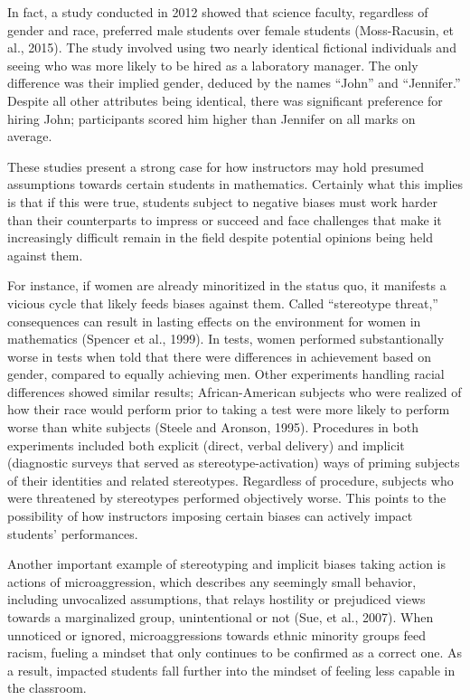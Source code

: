 In fact, a study conducted in 2012 showed that science faculty, regardless of gender and race, preferred male students over female students (Moss-Racusin, et al., 2015). The study involved using two nearly identical fictional individuals and seeing who was more likely to be hired as a laboratory manager. The only difference was their implied gender, deduced by the names ``John'' and ``Jennifer.'' Despite all other attributes being identical, there was significant preference for hiring John; participants scored him higher than Jennifer on all marks on average.

These studies present a strong case for how instructors may hold presumed assumptions towards certain students in mathematics. Certainly what this implies is that if this were true, students subject to negative biases must work harder than their counterparts to impress or succeed and face challenges that make it increasingly difficult remain in the field despite potential opinions being held against them.

For instance, if women are already minoritized in the status quo, it manifests a vicious cycle that likely feeds biases against them. Called ``stereotype threat,'' consequences can result in lasting effects on the environment for women in mathematics (Spencer et al., 1999). In tests, women performed substantionally worse in tests when told that there were differences in achievement based on gender, compared to equally achieving men. Other experiments handling racial differences showed similar results; African-American subjects who were realized of how their race would perform prior to taking a test were more likely to perform worse than white subjects (Steele and Aronson, 1995). Procedures in both experiments included both explicit (direct, verbal delivery) and implicit (diagnostic surveys that served as stereotype-activation) ways of priming subjects of their identities and related stereotypes. Regardless of procedure, subjects who were threatened by stereotypes performed objectively worse. This points to the possibility of how instructors imposing certain biases can actively impact students' performances.

Another important example of stereotyping and implicit biases taking action is actions of microaggression, which describes any seemingly small behavior, including unvocalized assumptions, that relays hostility or prejudiced views towards a marginalized group, unintentional or not (Sue, et al., 2007). When unnoticed or ignored, microaggressions towards ethnic minority groups feed racism, fueling a mindset that only continues to be confirmed as a correct one. As a result, impacted students fall further into the mindset of feeling less capable in the classroom.

